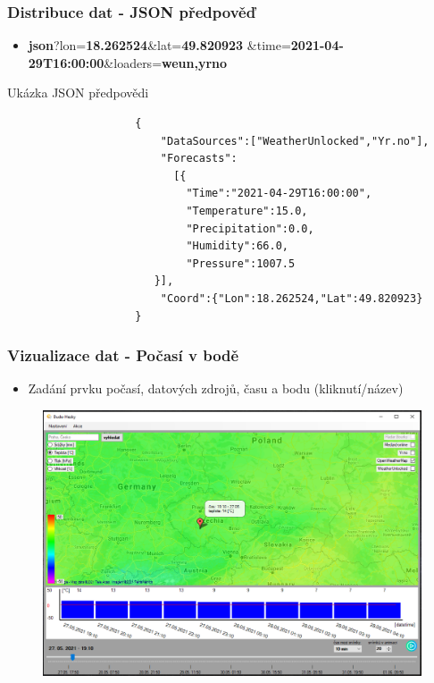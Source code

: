 \documentclass{beamer}
\begin{document}
	\begin{frame}[fragile]
		\frametitle{Distribuce dat - JSON předpověď}
			
			\begin{itemize}
				\item \textbf{json}?lon=\textbf{18.262524}\&lat=\textbf{49.820923}
				\&time=\textbf{2021-04-29T16:00:00}\&loaders=\textbf{weun,yrno}
			\end{itemize}
			
			\begin{exampleblock}{Ukázka JSON předpovědi}
				\begin{verbatim}
					{
					    "DataSources":["WeatherUnlocked","Yr.no"],
					    "Forecasts":
					      [{
					        "Time":"2021-04-29T16:00:00",
					        "Temperature":15.0,
					        "Precipitation":0.0,
					        "Humidity":66.0,
					        "Pressure":1007.5
				       }],
					    "Coord":{"Lon":18.262524,"Lat":49.820923}
					}
				\end{verbatim}
			\end{exampleblock}
	\end{frame}

	\begin{frame}
		\frametitle{Vizualizace dat - Počasí v bodě}
		
		\begin{itemize}
			\item Zadání prvku počasí, datových zdrojů, času a bodu (kliknutí/název)
		\end{itemize}
	
		\begin{figure}
			
			\includegraphics[scale=0.35]{figures/bod počasí.PNG}
			
		\end{figure}
	
	\end{frame}
\end{document}
